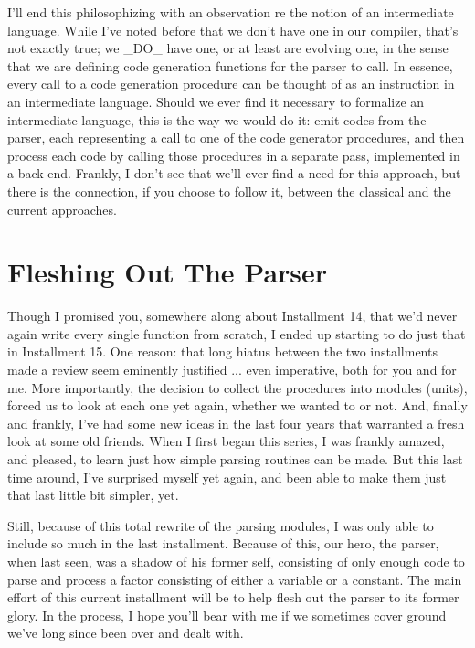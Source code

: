 \documentclass[float=false, crop=false]{standalone}
\begin{document}
I'll end this philosophizing with an observation re the notion of an
intermediate language.  While I've noted before that we don't have one
in our compiler, that's not exactly true; we _DO_ have one, or at least
are evolving one, in the sense that we are defining code generation
functions for the parser to call.  In essence, every call to a code
generation procedure can be thought of as an instruction in an
intermediate language.  Should we ever find it necessary to formalize an
intermediate language, this is the way we would do it:  emit codes from
the parser, each representing a call to one of the code generator
procedures, and then process each code by calling those procedures in a
separate pass, implemented in a back end. Frankly, I don't see that
we'll ever find a need for this approach, but there is the connection,
if you choose to follow it, between the classical and the current
approaches.



\section{Fleshing Out The Parser}

Though I promised you, somewhere along about Installment 14, that we'd
never again write every single function from scratch, I ended up
starting to do just that in Installment 15.  One reason: that long
hiatus between the two installments made a review seem eminently
justified ... even imperative, both for you and for me. More
importantly, the decision to collect the procedures into modules
(units), forced us to look at each one yet again, whether we wanted to
or not.  And, finally and frankly, I've had some new ideas in the last
four years that warranted a fresh look at some old friends.  When I
first began this series, I was frankly amazed, and pleased, to learn
just how simple parsing routines can be made.  But this last time
around, I've surprised myself yet again, and been able to make them just
that last little bit simpler, yet.

Still, because of this total rewrite of the parsing modules, I was only
able to include so much in the last installment.  Because of this, our
hero, the parser, when last seen, was a shadow of his former self,
consisting of only enough code to parse and process a factor consisting
of either a variable or a constant.  The main effort of this current
installment will be to help flesh out the parser to its former glory.
In the process, I hope you'll bear with me if we sometimes cover ground
we've long since been over and dealt with.
\end{document}
